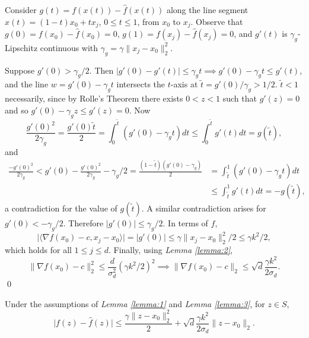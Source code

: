 \documentclass[smallextended,final]{svjour3}  %
\begin{document}
\begin{proofdot}
  \def\g{\gamma_g}
  Consider $g(t)=f(x(t)) - \hat f(x(t))$ along
  the line segment $x(t)=(1-t)x_0 + tx_j$, $0\le t\le1$, from $x_0$ to
  $x_j$.  Observe that $g(0)=f(x_0) - \hat f(x_0) = 0$, $g(1)=f(x_j) -
  \hat f(x_j) = 0$, and $g'(t)$ is $\g$-Lipschitz continuous with $\g
  = \gamma \|x_j-x_0\|_2^2$.

  Suppose $g'(0) > \g/2$. Then $|g'(0)-g'(t)| \le \g t \implies g'(0)
  - \g t \le g'(t)$, and the line $w=g'(0)-\g t$ intersects the
  $t$-axis at $\tilde t=g'(0)/\g > 1/2$. $\tilde t<1$ necessarily,
  since by Rolle's Theorem there exists $0<z<1$ such that $g'(z)=0$
  and so $g'(0) - \g z \le g'(z) = 0$. Now
  $$\frac{g'(0)^2}{2\g} = \frac{g'(0)\tilde t}{2} = \int_0^{\tilde t}
  (g'(0)-\g t)dt \le \int_0^{\tilde t} g'(t)dt = g(\tilde t),$$ and
  \begin{align*}
    \frac{-g'(0)^2}{2\g} < g'(0) - \frac{g'(0)^2}{2\g} - \g/2 =
    \frac{(1-\tilde t)(g'(0)-\g)}{2} &= \int_{\tilde t}^1 (g'(0)-\g
    t)dt \\ &\le \int_{\tilde t}^1 g'(t)dt = -g(\tilde t),
  \end{align*}
  \noindent a contradiction for the value of $g(\tilde t)$. A similar
  contradiction arises for $g'(0)<-\g/2$. Therefore $|g'(0)| \le
  \g/2$. In terms of $f$,
  $$\bigl|\langle \nabla f(x_0)-c,x_j-x_0\rangle\bigr| = |g'(0)| \le
  \gamma \|x_j-x_0\|_2^2/2 \le \gamma k^2 / 2,$$ which holds for all
  $1\le j\le d$.  Finally, using {\it Lemma \ref{lemma:2}},
  $$\|\nabla f(x_0)-c\|_2^2 \le \frac{d}{\sigma_d^2}(\gamma k^2/2)^2
  \implies \|\nabla f(x_0)-c\|_2 \le \sqrt{d}\frac{\gamma
    k^2}{2\sigma_d}.$$ \qed
\end{proofdot}

\begin{onetheorem}
  Under the assumptions of {\it Lemma \ref{lemma:1}} and {\it Lemma
    \ref{lemma:3}}, for $z \in S$,
  $$ \big|f(z) - \hat f(z)\big| \leq \frac{\gamma \|z - x_0\|_2^2}{2} + \sqrt{d} \frac{\gamma k^2}{2 \sigma_d} \|z - x_0\|_2.$$
\end{onetheorem}
\end{document}
